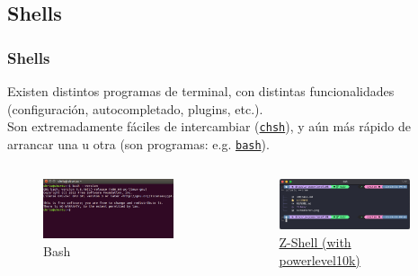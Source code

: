 \documentclass[aspectratio=43]{beamer}
\begin{document}
\subsection{Shells}

\begin{frame}
    \frametitle{Shells}
    Existen distintos programas de terminal, con distintas funcionalidades (configuración, autocompletado, plugins, etc.).\\
    Son extremadamente fáciles de intercambiar (\href{https://man7.org/linux/man-pages/man1/chsh.1.html}{\texttt{chsh}}), y aún más rápido de arrancar una u otra (son programas: e.g. \href{https://www.man7.org/linux/man-pages/man1/bash.1.html}{\texttt{bash}}). 

    \begin{columns}[c]
        \begin{column}{0.5\textwidth}
            \begin{figure}
                \centering
                \includegraphics[width=0.9\textwidth]{img/bash_shell.jpg}
                \caption{Bash}
            \end{figure}
        \end{column}
        \begin{column}{0.5\textwidth}
            \begin{figure}
                \centering
                \includegraphics[width=0.9\textwidth]{img/powerlevel10k.png}
                \caption{\href{https://www.zsh.org/}{Z-Shell }\href{https://github.com/romkatv/powerlevel10k}{(with powerlevel10k)}}
            \end{figure}
        \end{column}
    \end{columns}

\end{frame}
\end{document}
